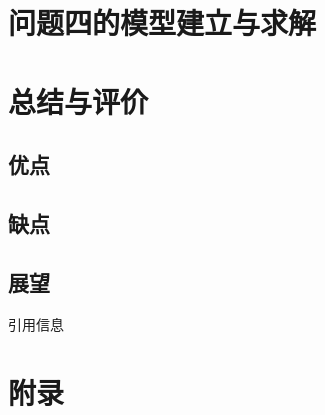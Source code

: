 \documentclass[12pt,a4paper]{article}
\begin{document}
\clearpage
\section{问题四的模型建立与求解}

\clearpage
\section{总结与评价}
\subsection{优点}



\subsection{缺点}

\subsection{展望}




\clearpage
% 
\begin{thebibliography}{99}
     引用信息
    

\end{thebibliography}

\clearpage

\section*{附录}


\end{document}
